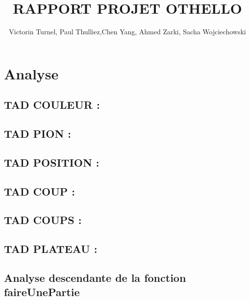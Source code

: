 \documentclass{article}
\title{RAPPORT PROJET OTHELLO}
\author{Victorin Turnel, Paul Thulliez,Chen Yang, Ahmed Zarki, Sacha Wojciechowski}
\begin{document}
\maketitle
\tableofcontents

\section{Analyse}

\subsection{TAD COULEUR :}


\subsection{TAD PION :}


\subsection{TAD POSITION :}


\subsection{TAD COUP :}


\subsection{TAD COUPS :}


\subsection{TAD PLATEAU :}



\subsection{Analyse descendante de la fonction faireUnePartie}
\end{document}
